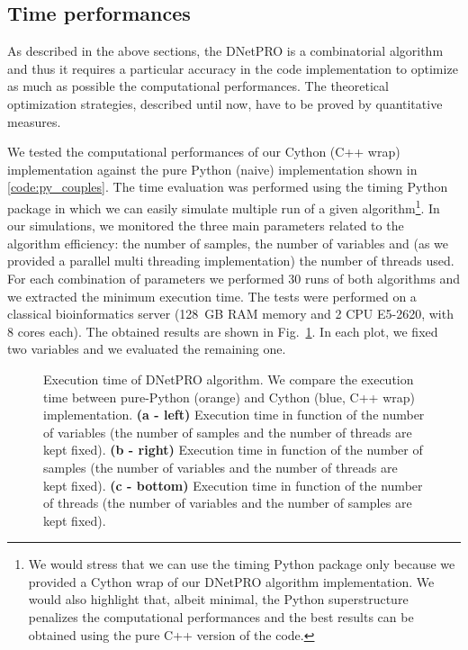 \documentclass{standalone}
\begin{document}
\subsection[Time performances]{Time performances}\label{implementation:timing}

As described in the above sections, the \textsf{DNetPRO} is a combinatorial algorithm and thus it requires a particular accuracy in the code implementation to optimize as much as possible the computational performances.
The theoretical optimization strategies, described until now, have to be proved by quantitative measures.

We tested the computational performances of our \textsf{Cython} (\textsf{C++} wrap) implementation against the pure \textsf{Python} (naive) implementation shown in \ref{code:py_couples}.
The time evaluation was performed using the \textsf{timing} \textsf{Python} package in which we can easily simulate multiple run of a given algorithm\footnote{
  We would stress that we can use the \textsf{timing} \textsf{Python} package only because we provided a \textsf{Cython} wrap of our \textsf{DNetPRO} algorithm implementation.
  We would also highlight that, albeit minimal, the \textsf{Python} superstructure penalizes the computational performances and the best results can be obtained using the pure \textsf{C++} version of the code.
}.
In our simulations, we monitored the three main parameters related to the algorithm efficiency: the number of samples, the number of variables and (as we provided a parallel multi threading implementation) the number of threads used.
For each combination of parameters we performed 30 runs of both algorithms and we extracted the minimum execution time.
The tests were performed on a classical bioinformatics server (128~GB RAM memory and 2 CPU E5-2620, with 8 cores each).
The obtained results are shown in Fig.~\ref{fig:dnetpro_timing}.
In each plot, we fixed two variables and we evaluated the remaining one.

\begin{figure}[htbp]
\hspace{-1.0cm}
\def\svgwidth{0.45\textwidth}

\qquad
\hspace{1.0cm}
\def\svgwidth{0.45\textwidth}

\qquad\qquad
\centering
\def\svgwidth{0.7\textwidth}

\caption{Execution time of \textsf{DNetPRO} algorithm.
We compare the execution time between pure-\textsf{Python} (orange) and \textsf{Cython} (blue, \textsf{C++} wrap) implementation.
\textbf{(a - left)} Execution time in function of the number of variables (the number of samples and the number of threads are kept fixed).
\textbf{(b - right)} Execution time in function of the number of samples (the number of variables and the number of threads are kept fixed).
\textbf{(c - bottom)} Execution time in function of the number of threads (the number of variables and the number of samples are kept fixed).
}
\label{fig:dnetpro_timing}
\end{figure}
\end{document}
